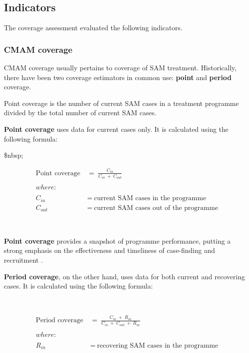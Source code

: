 \documentclass[12pt,a4paper]{article}
\begin{document}
\hypertarget{indicators}{%
\subsection{Indicators}\label{indicators}}

The coverage assessment evaluated the following indicators.

\hypertarget{cmam-coverage}{%
\subsubsection{CMAM coverage}\label{cmam-coverage}}

CMAM coverage usually pertains to coverage of SAM treatment. Historically, there have been two coverage estimators in common use: \textbf{point} and \textbf{period} coverage.

Point coverage is the number of current SAM cases in a treatment programme divided by the total number of current SAM cases.

\textbf{Point coverage} uses data for current cases only. It is calculated using the following formula:

\$nbsp;

\[\begin{aligned} 
\text{Point coverage} & ~ = ~ \frac{C_{in}}{C_{in} ~ + ~ C_{out}} \\
\\
where: & \\
\\
C_{in} & ~ = ~ \text{current SAM cases in the programme} \\
C_{out} & ~ = ~ \text{current SAM cases out of the programme}
\end{aligned}\]

~

\textbf{Point coverage} provides a snapshot of programme performance, putting a strong emphasis on the effectiveness and timeliness of case-finding and recruitment \citep{Myatt:2012tt}.

\textbf{Period coverage}, on the other hand, uses data for both current and recovering cases. It is calculated using the following formula:

~

\[\begin{aligned}
\text{Period coverage} & ~ = ~ \frac{C_{in} ~ + ~ R_{in}}{C_{in} ~ + ~ C_{out} ~ + ~ R_{in}} \\
\\
where: & \\
\\
R_{in} & ~ = ~ \text{recovering SAM cases in the programme}
\end{aligned}\]
\end{document}

